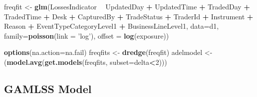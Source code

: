 \documentclass[]{article}
\newenvironment{Shaded}{\begin{snugshade}}{\end{snugshade}}
\newcommand{\KeywordTok}[1]{\textcolor[rgb]{0.13,0.29,0.53}{\textbf{#1}}}
\newcommand{\DataTypeTok}[1]{\textcolor[rgb]{0.13,0.29,0.53}{#1}}
\newcommand{\DecValTok}[1]{\textcolor[rgb]{0.00,0.00,0.81}{#1}}
\newcommand{\StringTok}[1]{\textcolor[rgb]{0.31,0.60,0.02}{#1}}
\newcommand{\OperatorTok}[1]{\textcolor[rgb]{0.81,0.36,0.00}{\textbf{#1}}}
\newcommand{\NormalTok}[1]{#1}
\begin{document}
\begin{Shaded}
\begin{Highlighting}[]
\NormalTok{freqfit <-}\StringTok{ }\KeywordTok{glm}\NormalTok{(LossesIndicator }\OperatorTok{~}\StringTok{ }\NormalTok{UpdatedDay }\OperatorTok{+}\StringTok{ }\NormalTok{UpdatedTime }\OperatorTok{+}\StringTok{ }\NormalTok{TradedDay}
               \OperatorTok{+}\StringTok{ }\NormalTok{TradedTime }\OperatorTok{+}\StringTok{ }\NormalTok{Desk }\OperatorTok{+}\StringTok{ }\NormalTok{CapturedBy }\OperatorTok{+}\StringTok{ }\NormalTok{TradeStatus }\OperatorTok{+}
\StringTok{               }\NormalTok{TraderId }\OperatorTok{+}\StringTok{ }\NormalTok{Instrument }\OperatorTok{+}\StringTok{ }\NormalTok{Reason }\OperatorTok{+}\StringTok{ }
\StringTok{               }\NormalTok{EventTypeCategoryLevel1 }\OperatorTok{+}\StringTok{ }\NormalTok{BusinessLineLevel1, }\DataTypeTok{data=}\NormalTok{d1,}
               \DataTypeTok{family=}\KeywordTok{poisson}\NormalTok{(}\DataTypeTok{link =} \StringTok{'log'}\NormalTok{), }\DataTypeTok{offset =} \KeywordTok{log}\NormalTok{(exposure))}
\end{Highlighting}
\end{Shaded}

\begin{Shaded}
\begin{Highlighting}[]
\KeywordTok{options}\NormalTok{(}\DataTypeTok{na.action=}\NormalTok{na.fail)}
\NormalTok{freqfits <-}\StringTok{ }\KeywordTok{dredge}\NormalTok{(freqfit)}
\NormalTok{adelmodel <-}\StringTok{ }\NormalTok{(}\KeywordTok{model.avg}\NormalTok{(}\KeywordTok{get.models}\NormalTok{(freqfits, }\DataTypeTok{subset=}\NormalTok{delta}\OperatorTok{<}\DecValTok{2}\NormalTok{)))}
\end{Highlighting}
\end{Shaded}

\normalsize

\clearpage

\subsection*{GAMLSS Model}\label{gamlss-model}

\small
\end{document}
